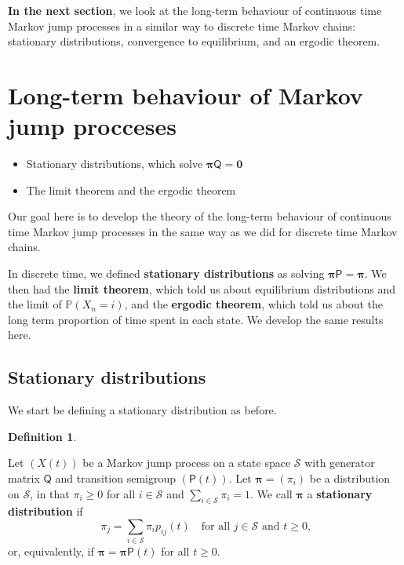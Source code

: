\documentclass[
  a4paper,
]{article}
\providecommand{\tightlist}{%
  \setlength{\itemsep}{0pt}\setlength{\parskip}{0pt}}
\theoremstyle{definition}
\newtheorem{definition}{Definition}[section]
\theoremstyle{definition}
\theoremstyle{definition}
\theoremstyle{remark}
\begin{document}
\textbf{In the next section}, we look at the long-term behaviour of continuous time Markov jump processes in a similar way to discrete time Markov chains: stationary distributions, convergence to equilibrium, and an ergodic theorem.

\hypertarget{S20-long-term-jump}{%
\section{Long-term behaviour of Markov jump procceses}\label{S20-long-term-jump}}

\begin{itemize}
\tightlist
\item
  Stationary distributions, which solve \(\boldsymbol\pi\mathsf Q = \mathbf 0\)
\item
  The limit theorem and the ergodic theorem
\end{itemize}

Our goal here is to develop the theory of the long-term behaviour of continuous time Markov jump processes in the same way as we did for discrete time Markov chains.

In discrete time, we defined \textbf{stationary distributions} as solving \(\boldsymbol\pi\mathsf P = \boldsymbol\pi\). We then had the \textbf{limit theorem}, which told us about equilibrium distributions and the limit of \(\mathbb P(X_n = i)\), and the \textbf{ergodic theorem}, which told us about the long term proportion of time spent in each state. We develop the same results here.

\hypertarget{stationary-jump}{%
\subsection{Stationary distributions}\label{stationary-jump}}

We start be defining a stationary distribution as before.

\begin{definition}
\protect\hypertarget{def:statdist2}{}\label{def:statdist2}

Let \((X(t))\) be a Markov jump process on a state space \(\mathcal S\) with generator matrix \(\mathsf Q\) and transition semigroup \((\mathsf P(t))\).
Let \(\boldsymbol \pi = (\pi_i)\) be a distribution on \(\mathcal S\), in that \(\pi_i \geq 0\) for all \(i \in \mathcal S\) and \(\sum_{i \in \mathcal S} \pi_i = 1\). We call \(\boldsymbol \pi\) a \textbf{stationary distribution} if
\[ \pi_j = \sum_{i\in \mathcal S} \pi_i p_{ij}(t) \quad \text{for all $j \in \mathcal S$ and $t \geq 0$,} \]
or, equivalently, if \(\boldsymbol \pi = \boldsymbol \pi\mathsf P(t)\) for all \(t \geq 0\).

\end{definition}
\end{document}
